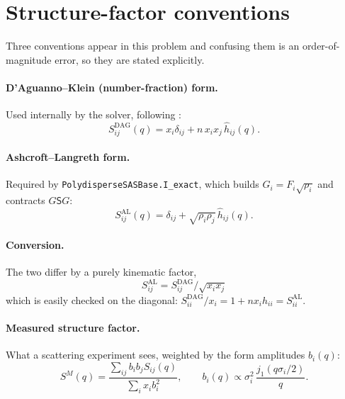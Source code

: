 \documentclass[11pt,a4paper]{article}
\newcommand{\code}[1]{\texttt{#1}}
\begin{document}
\section{Structure-factor conventions}
\label{sec:conventions}

Three conventions appear in this problem and confusing them is an
order-of-magnitude error, so they are stated explicitly.

\paragraph{D'Aguanno--Klein (number-fraction) form.} Used internally by the
solver, following \cite{daguanno1991}:
\begin{equation}
S^{\mathrm{DAG}}_{ij}(q) = x_i\delta_{ij} + n\,x_i x_j\,\hat h_{ij}(q).
\end{equation}

\paragraph{Ashcroft--Langreth form.} Required by
\code{PolydisperseSASBase.I\_exact}, which builds
$G_i=F_i\sqrt{\rho_i}$ and contracts $G\mathsf{S}G$:
\begin{equation}
S^{\mathrm{AL}}_{ij}(q) = \delta_{ij} + \sqrt{\rho_i\rho_j}\,\hat h_{ij}(q).
\end{equation}

\paragraph{Conversion.} The two differ by a purely kinematic factor,
\begin{equation}
\boxed{\;S^{\mathrm{AL}}_{ij} = S^{\mathrm{DAG}}_{ij}\big/\sqrt{x_i x_j}\;}
\label{eq:alconv}
\end{equation}
which is easily checked on the diagonal: $S^{\mathrm{DAG}}_{ii}/x_i
= 1+n x_i \hat h_{ii} = S^{\mathrm{AL}}_{ii}$.

\paragraph{Measured structure factor.} What a scattering experiment sees,
weighted by the form amplitudes $b_i(q)$:
\begin{equation}
S^{M}(q) = \frac{\sum_{ij} b_i b_j S_{ij}(q)}{\sum_i x_i b_i^2},
\qquad
b_i(q)\propto \sigma_i^2\,\frac{j_1(q\sigma_i/2)}{q}.
\end{equation}
\end{document}
